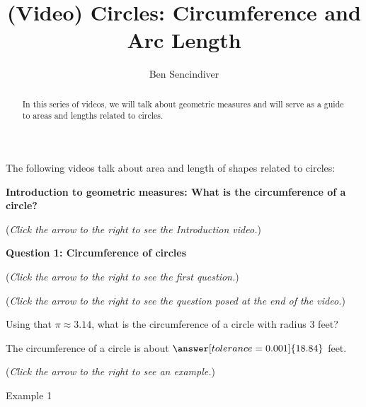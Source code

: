 \documentclass{ximera}
\title[Prerequisite Videos: ]{(Video) Circles: Circumference and Arc Length}
\author{Ben Sencindiver}
\begin{document}
\begin{abstract}
  In this series of videos, we will talk about geometric measures and will
  serve as a guide to areas and lengths related to circles. 
\end{abstract}
\maketitle

The following videos talk about area and length of shapes related to circles:

\textbf{Introduction to geometric measures: What is the circumference
of a circle?}
\begin{explanation}
\begin{flushright}
{\color{blue}(\emph{Click the arrow to the right to see the Introduction video.})}
\end{flushright}
\begin{center}
\begin{expandable}
\end{expandable}
\end{center}
\end{explanation}

\textbf{Question 1: Circumference of circles}
\begin{question}
\begin{flushright}
{\color{blue}(\emph{Click the arrow to the right to see the first question.})}
\end{flushright}
\begin{center}
\begin{expandable}
{\color{blue}(\emph{Click the arrow to the right to see the question
posed at the end of the video.})}
\begin{expandable}
Using that $\pi\approx 3.14$, what is the circumference of a circle with radius $3$ feet?\\
\begin{prompt}
The circumference of a circle is about $\answer[tolerance=0.001]{18.84}$ feet.
\end{prompt}
\begin{flushright}
{\color{blue}(\emph{Click the arrow to the right to see an example.})}
\end{flushright}
\begin{expandable}
Example 1
\end{expandable}
\end{expandable}
\end{expandable}
\end{center}
\end{question}
\end{document}
